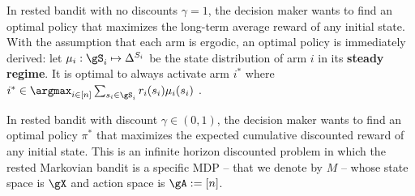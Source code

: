 In rested bandit with no discounts $\gamma=1$, the decision maker wants to find an optimal policy that maximizes the long-term average reward of any initial state.
With the assumption that each arm is ergodic, an optimal policy is immediately derived: let $\mu_i:\gS_i\mapsto\Delta^{S_i}$ be the state distribution of arm $i$ in its \textbf{steady regime}.
It is optimal to always activate arm $i^*$ where $i^*\in\argmax_{i\in[n]}\sum_{s_i\in\gS_i}r_i(s_i)\mu_i(s_i)$ \cite{tekin2010online}.


In rested bandit with discount $\gamma\in(0,1)$, the decision maker wants to find an optimal policy $\pi^*$ that maximizes the expected cumulative discounted reward of any initial state.
This is an infinite horizon discounted problem in which the rested Markovian bandit is a specific MDP -- that we denote by $M$ -- whose state space is $\gX$ and action space is $\gA:=[n]$.

